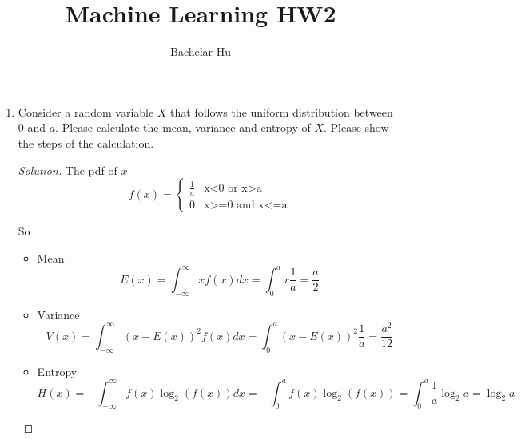 \documentclass{article}
\author{Bachelar Hu}
\title{Machine Learning HW2}
\newenvironment{solution}
  {\renewcommand\qedsymbol{$\blacksquare$}\begin{proof}[Solution]}
  {\end{proof}}
\begin{document}
\maketitle
\setlength{\baselineskip}{15pt}
\begin{enumerate}
\item Consider a random variable $X$ that follows the uniform distribution between $0$ and $a$. Please calculate the mean, variance and entropy of $X$. Please show the steps of the calculation.
\begin{solution}
    The pdf of $x$
    \[
        f(x)=
            \begin{cases}
                \frac{1}{a} & \text{x<0 or x>a}\\
                0           & \text{x>=0 and x<=a}
            \end{cases}
    \]

    So
    \begin{itemize}
        \item Mean
            \[E(x) = \int_{-\infty}^{\infty} xf(x) dx =
            \int_{0}^{a}x\frac{1}{a} = \frac{a}{2}\]
        \item Variance
            \[V(x) = \int_{-\infty}^{\infty} (x - E(x))^{2}f(x) dx =
            \int_{0}^{a}(x - E(x))^{2}\frac{1}{a} = \frac{a^{2}}{12}\]
        \item Entropy
            \[
                H(x) = -\int_{-\infty}^{\infty}f(x) \log_{2}(f(x)) dx =
                -\int_{0}^{a}f(x)\log_{2}(f(x))
                = \int_{0}^{a}\frac{1}{a}\log_{2}{a} = \log_{2}{a}
            \]
    \end{itemize}



\end{solution}
\end{enumerate}
\end{document}
